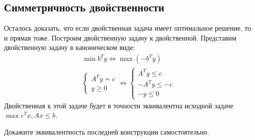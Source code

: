 \subsection{Симметричность двойственности}

Осталось доказать, что если двойственная задача имеет оптимальное решение, то и прямая тоже. 
Построим двойственную задачу к двойственной. Представим двойственную задачу в каноническом виде:
\begin{gather*}
    \min b^T y \iff \max (-b^T y) \\
    \begin{cases} A^T y = c \\ y \ge 0 \end{cases}
    \iff
    \begin{cases} A^T y \le c \\ -A^T y \le -c \\ -y \le 0 \end{cases}
\end{gather*}
Двойственная к этой задаче будет в точности эквивалентна исходной задаче $\max c^T x, Ax \le b$.

\exercise
Докажите эквивалентность последней конструкции самостоятельно.
